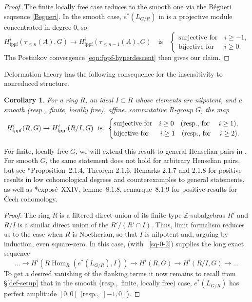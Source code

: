 \documentclass[11pt, reqno]{amsart}
\newcommand{\bZ}{\mathbb{Z}}
\DeclareMathOperator{\Hom}{Hom}		%
\newcommand{\fppf}{\mathrm{fppf}}		%
\newcommand{\ra}{\rightarrow}
\providecommand{\resp}[1]{{\upshape(}resp.,~#1{\upshape)}}
\newcommand{\x}{\text}
\providecommand{\qxq}[1]{\quad\text{#1}\quad}
\providecommand{\qx}[1]{\quad\text{#1}}
\providecommand{\xq}[1]{\text{#1}\quad}
\newcommand{\q}{\quad}
\newcommand{\bpf}{\begin{proof}}
\newcommand{\epf}{\end{proof}}
\newcommand{\bcor}{\begin{cor}}
\newcommand{\ecor}{\end{cor}}
\numberwithin{equation}{numberingbase}
\theoremstyle{thms}
\newtheorem{cor}[numberingbase]{Corollary}
\theoremstyle{claims}
\theoremstyle{defs}
\theoremstyle{thms}
\theoremstyle{defs}
\theoremstyle{subsection-tweak}
\theoremstyle{subsection-tweak}
\begin{document}
\bpf
The finite locally free case reduces to the smooth one via the B\'{e}gueri sequence \eqref{Begueri}. In the smooth case, $e^*(L_{G/R})$ in  is a projective module concentrated in degree $0$, so %
\[
H^i_\fppf(\tau_{\le n}(A), G) \ra H^i_\fppf(\tau_{\le n - 1}(A), G) \qxq{is} \begin{cases} \xq{surjective for} i \ge -1, \\ \xq{bijective for} \, \, \, i \ge 0. \end{cases}
\]
The Postnikov convergence \eqref{eqn:fppf-hyperdescent} then gives our claim.
\epf



Deformation theory has the following consequence for the insensitivity to nonreduced structure. 

\bcor \label{no-nil-feelings}
For a ring $R$, an ideal $I \subset R$ whose elements are nilpotent, and a smooth \resp{finite, locally free}, affine, commutative $R$-group $G$, the map
\[
H^i_\fppf(R, G) \ra H^i_\fppf(R/I, G) \ \ \x{is}\ \ \begin{cases} \xq{surjective for} i\ge 0 \qx{\resp{for $\q i \ge 1$}}, \\   \xq{bijective for} \ \  i\ge 1 \qx{\resp{for $\q i \ge 2$}.} \end{cases}
\]
\ecor


For finite, locally free $G$, we will extend this result to general Henselian pairs in . For smooth $G$, the same statement does not hold for arbitrary Henselian pairs, but see \cite{BC19}*{Proposition~2.1.4, Theorem 2.1.6, Remarks 2.1.7 and 2.1.8} for positive results in low cohomological degrees and counterexamples to general statements, as well as \cite{SGA3IIInew}*{expos\'{e}~XXIV, lemme~8.1.8, remarque~8.1.9} for positive results for \v{C}ech cohomology.

\bpf
The ring $R$ is a filtered direct union of its finite type $\bZ$-subalgebras $R'$ and $R/I$ is a similar direct union of the $R'/(R' \cap I)$. Thus, limit formalism reduces us to the case when $R$ is Noetherian, so that $I$ is nilpotent and, arguing by induction, even square-zero. In this case,  (with ~\ref{sq-0-2}) supplies the long exact sequence
\[
\dotsc \ra H^{i}(R\Hom_R(e^*(L_{G/R}), I)) \ra H^i(R, G) \ra H^i(R/I, G) \ra%
\dotsc
\]
To get a desired vanishing of the flanking terms it now remains to recall from \S\ref{def-setup} that in the smooth \resp{finite, locally free} case, $e^*(L_{G/R})$ has perfect amplitude $[0, 0]$ \resp{$[-1, 0]$}.
\epf
\end{document}
